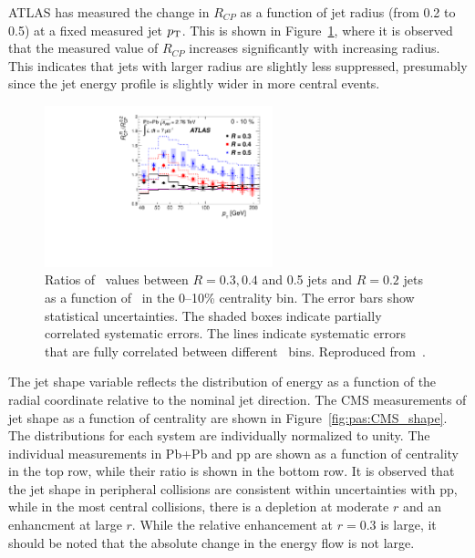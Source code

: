 ATLAS has measured the change in $R_{CP}$ as a function of jet radius (from 0.2 to 0.5) at
a fixed measured jet $\mbox{$p_{\mathrm{T}}$}$.  This is shown in Figure~\ref{fig:pas:ATLAS_jet_rcp}, where it
is observed that the measured value of $R_{CP}$ increases significantly with increasing radius.
This indicates that jets with larger radius are slightly less suppressed, presumably since 
the jet energy profile is slightly wider in more central events.
\begin{figure}[!th]
\includegraphics[width=0.59\textwidth]{jetfigures/ATLAS_jetRCP_size.pdf}
\begin{center}
\caption{
Ratios of \Rcp\ values between $R = 0.3, 0.4$ and 0.5 jets and $R =
0.2$ jets as a function of \pT\ in the 0--10\% centrality bin. The
error bars show statistical uncertainties. The shaded boxes
indicate partially correlated systematic errors. The lines indicate
systematic errors that are fully correlated between different \pT\ bins.
Reproduced from~\cite{Aad:2012is}.
}
\label{fig:pas:ATLAS_jet_rcp}
\end{center}
\end{figure}

The jet shape variable reflects the distribution of energy as a function of the radial coordinate
relative to the nominal jet direction.
The CMS measurements of jet shape as a function of centrality are shown in Figure~\ref{fig:pas:CMS_shape}.
The distributions for each system are individually normalized to unity.
The individual measurements in Pb+Pb and pp are shown as a function of centrality in the top row,
while their ratio is shown in the bottom row.
It is observed that the jet shape in peripheral collisions are consistent within uncertainties with pp,
while in the most central collisions, there is a depletion at moderate $r$ and an enhancment at large $r$.
While the relative enhancement at $r=0.3$ is large, it should be noted that the absolute change in the energy
flow is not large.


